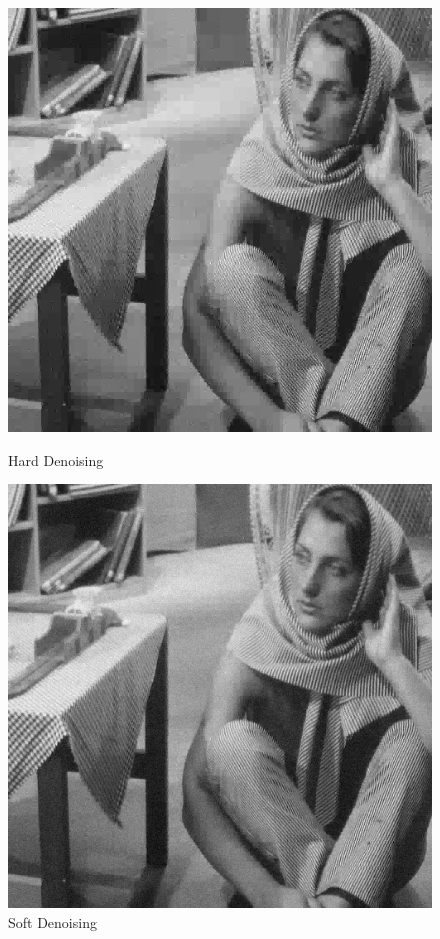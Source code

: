 \documentclass{article}
\begin{document}
    \begin{figure}[!htb]
      \includegraphics[scale=0.4]{./denoising/b/hard0.15.png}
      \caption{Hard Denoising}
    \endminipage \hfill
      \includegraphics[scale=.4]{./denoising/b/smooth0.05.png}
      \caption{Soft Denoising}
    \endminipage
    \end{figure}
    \pagebreak
\end{document}
